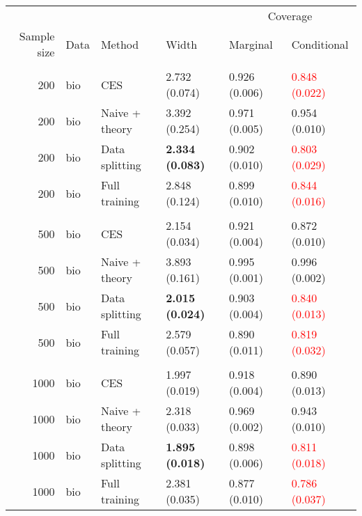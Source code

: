 
\begin{tabular}[t]{rlllll}
\toprule
\multicolumn{4}{c}{ } & \multicolumn{2}{c}{Coverage} \\
\cmidrule(l{3pt}r{3pt}){5-6}
Sample size & Data & Method & Width & Marginal & Conditional\\
\midrule
\addlinespace[0.3em]
\multicolumn{6}{l}{\textbf{200}}\\
\hspace{1em}200 & bio & CES & 2.732 (0.074) & 0.926 (0.006) & \textcolor{red}{0.848 (0.022)}\\
\hspace{1em}200 & bio & Naive + theory & 3.392 (0.254) & 0.971 (0.005) & 0.954 (0.010)\\
\hspace{1em}200 & bio & Data splitting & \textbf{2.334 (0.083)} & 0.902 (0.010) & \textcolor{red}{0.803 (0.029)}\\
\hspace{1em}200 & bio & Full training & 2.848 (0.124) & 0.899 (0.010) & \textcolor{red}{0.844 (0.016)}\\
\addlinespace[0.3em]
\multicolumn{6}{l}{\textbf{500}}\\
\hspace{1em}500 & bio & CES & 2.154 (0.034) & 0.921 (0.004) & 0.872 (0.010)\\
\hspace{1em}500 & bio & Naive + theory & 3.893 (0.161) & 0.995 (0.001) & 0.996 (0.002)\\
\hspace{1em}500 & bio & Data splitting & \textbf{2.015 (0.024)} & 0.903 (0.004) & \textcolor{red}{0.840 (0.013)}\\
\hspace{1em}500 & bio & Full training & 2.579 (0.057) & 0.890 (0.011) & \textcolor{red}{0.819 (0.032)}\\
\addlinespace[0.3em]
\multicolumn{6}{l}{\textbf{1000}}\\
\hspace{1em}1000 & bio & CES & 1.997 (0.019) & 0.918 (0.004) & 0.890 (0.013)\\
\hspace{1em}1000 & bio & Naive + theory & 2.318 (0.033) & 0.969 (0.002) & 0.943 (0.010)\\
\hspace{1em}1000 & bio & Data splitting & \textbf{1.895 (0.018)} & 0.898 (0.006) & \textcolor{red}{0.811 (0.018)}\\
\hspace{1em}1000 & bio & Full training & 2.381 (0.035) & 0.877 (0.010) & \textcolor{red}{0.786 (0.037)}\\

\end{tabular}
